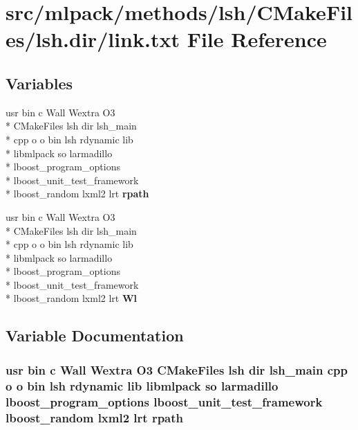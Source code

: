 \section{src/mlpack/methods/lsh/\-C\-Make\-Files/lsh.dir/link.txt File Reference}
\label{methods_2lsh_2CMakeFiles_2lsh_8dir_2link_8txt}
\subsection*{Variables}
\begin{DoxyCompactItemize}
\item 
usr bin c Wall Wextra O3 \\*
C\-Make\-Files lsh dir lsh\-\_\-main \\*
cpp o o bin lsh rdynamic lib \\*
libmlpack so larmadillo \\*
lboost\-\_\-program\-\_\-options \\*
lboost\-\_\-unit\-\_\-test\-\_\-framework \\*
lboost\-\_\-random lxml2 lrt {\bf rpath}
\item 
usr bin c Wall Wextra O3 \\*
C\-Make\-Files lsh dir lsh\-\_\-main \\*
cpp o o bin lsh rdynamic lib \\*
libmlpack so larmadillo \\*
lboost\-\_\-program\-\_\-options \\*
lboost\-\_\-unit\-\_\-test\-\_\-framework \\*
lboost\-\_\-random lxml2 lrt {\bf Wl}
\end{DoxyCompactItemize}


\subsection{Variable Documentation}
\subsubsection[{rpath}]{\setlength{\rightskip}{0pt plus 5cm}usr bin c Wall Wextra O3 C\-Make\-Files lsh dir lsh\-\_\-main cpp o o bin lsh rdynamic lib libmlpack so larmadillo lboost\-\_\-program\-\_\-options lboost\-\_\-unit\-\_\-test\-\_\-framework lboost\-\_\-random lxml2 lrt rpath}\label{methods_2lsh_2CMakeFiles_2lsh_8dir_2link_8txt_a51fbf0bd58f64642ee50c13fd5fc9857}


